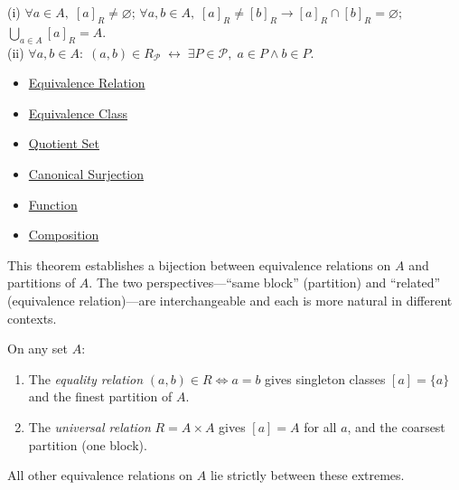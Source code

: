 \begin{remark*}
(i) $\forall a \in A,\; [a]_R \neq \varnothing$; $\forall a,b \in A,\; [a]_R \neq [b]_R \to [a]_R \cap [b]_R = \varnothing$; $\bigcup_{a \in A}[a]_R = A$.\\
(ii) $\forall a,b \in A:\; (a,b) \in R_{\mathcal{P}} \;\leftrightarrow\; \exists P \in \mathcal{P},\; a \in P \wedge b \in P$.
\end{remark*}
\begin{dependencies}
\begin{itemize}
  \item \hyperref[def:equivalence-relation]{Equivalence Relation}
  \item \hyperref[def:equiv-class]{Equivalence Class}
  \item \hyperref[def:quotient-set]{Quotient Set}
  \item \hyperref[def:canonical-surj]{Canonical Surjection}
  \item \hyperref[def:function]{Function}
  \item \hyperref[def:composition]{Composition}
\end{itemize}
\end{dependencies}

\begin{remark*}
This theorem establishes a bijection between equivalence relations on $A$
and partitions of $A$. The two perspectives---``same block'' (partition) and
``related'' (equivalence relation)---are interchangeable and each is more
natural in different contexts.
\end{remark*}

\begin{example*}
On any set $A$:
\begin{enumerate}
\item The \emph{equality relation} $(a,b) \in R \iff a=b$ gives singleton
classes $[a] = \{a\}$ and the finest partition of $A$.
\item The \emph{universal relation} $R = A \times A$ gives $[a] = A$ for all
$a$, and the coarsest partition (one block).
\end{enumerate}
All other equivalence relations on $A$ lie strictly between these extremes.
\end{example*}


